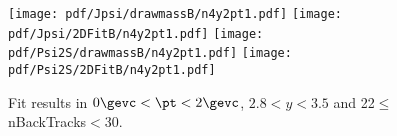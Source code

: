 \begin{figure}[H]
\begin{center}
\texttt{[image: pdf/Jpsi/drawmassB/n4y2pt1.pdf]}
\texttt{[image: pdf/Jpsi/2DFitB/n4y2pt1.pdf]}
\vspace*{-0.5cm}
\texttt{[image: pdf/Psi2S/drawmassB/n4y2pt1.pdf]}
\texttt{[image: pdf/Psi2S/2DFitB/n4y2pt1.pdf]}
\vspace*{-0.5cm}
\end{center}
\caption{Fit results in $0\gevc<\pt<2\gevc$, $2.8<y<3.5$ and 22$\leq$nBackTracks$<$30.}
\label{Fitn4y2pt1}
\end{figure}
